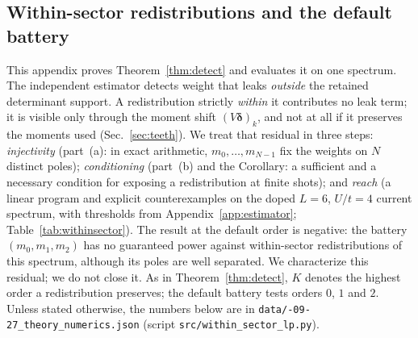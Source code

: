 \documentclass[submission, PhysCore]{SciPost}
\begin{document}
\begin{appendix}
\section{Within-sector redistributions and the default battery}
\label{app:withinsector}
This appendix proves Theorem~\ref{thm:detect} and evaluates it on one spectrum. The independent estimator detects weight that leaks \emph{outside} the retained determinant support. A redistribution strictly \emph{within} it contributes no leak term; it is visible only through the moment shift $(V\bm{\delta})_k$, and not at all if it preserves the moments used (Sec.~\ref{sec:teeth}). We treat that residual in three steps: \emph{injectivity} (part~(a): in exact arithmetic, $m_0,\dots,m_{N-1}$ fix the weights on $N$ distinct poles); \emph{conditioning} (part~(b) and the Corollary: a sufficient and a necessary condition for exposing a redistribution at finite shots); and \emph{reach} (a linear program and explicit counterexamples on the doped $L=6$, $U/t=4$ current spectrum, with thresholds from Appendix~\ref{app:estimator}; Table~\ref{tab:withinsector}). The result at the default order is negative: the battery $(m_0,m_1,m_2)$ has no guaranteed power against within-sector redistributions of this spectrum, although its poles are well separated. We characterize this residual; we do not close it. As in Theorem~\ref{thm:detect}, $K$ denotes the highest order a redistribution preserves; the default battery tests orders $0$, $1$ and $2$. Unless stated otherwise, the numbers below are in \texttt{data/-09-27\_theory\_numerics.json} (script \texttt{src/\allowbreak within\_sector\_lp.py}).


\end{appendix}
\end{document}
